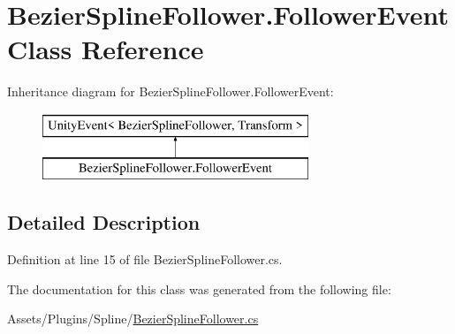 \hypertarget{class_bezier_spline_follower_1_1_follower_event}{}\section{Bezier\+Spline\+Follower.\+Follower\+Event Class Reference}
\label{class_bezier_spline_follower_1_1_follower_event}
Inheritance diagram for Bezier\+Spline\+Follower.\+Follower\+Event\+:\begin{figure}[H]
\begin{center}
\leavevmode
\includegraphics[height=2.000000cm]{class_bezier_spline_follower_1_1_follower_event}
\end{center}
\end{figure}


\subsection{Detailed Description}


Definition at line 15 of file Bezier\+Spline\+Follower.\+cs.



The documentation for this class was generated from the following file\+:\begin{DoxyCompactItemize}
\item 
Assets/\+Plugins/\+Spline/\mbox{\hyperlink{_bezier_spline_follower_8cs}{Bezier\+Spline\+Follower.\+cs}}\end{DoxyCompactItemize}
